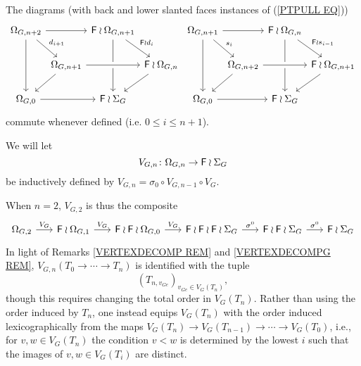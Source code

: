\documentclass[a4paper,10pt]{article}%
\begin{document}
\begin{remark}\label{DSCOM REM}
The diagrams (with back and lower slanted faces instances of (\ref{PTPULL EQ}))
	\[
	\begin{tikzcd}[column sep = 0.1em]
		\Omega_{G,{n+2}} \ar{rr} \ar{rd}{d_{i+1}} \ar{dd}
		 & & \Fin \wr \Omega_{G,{n+1}} \ar{rd}{\Fin \wr d_i} \ar{dd} & &
		\Omega_{G,{n+1}} \ar{rr} \ar{rd}{s_{i}} \ar{dd} 
		& & \Fin \wr \Omega_{G,{n}} \ar{rd}{\Fin \wr s_{i-1}} \ar{dd} &
	\\
		& \Omega_{G,{n+1}} \ar{ld} \ar[crossing over]{rr} 
		& & \Fin \wr \Omega_{G,{n}} \ar{ld} &
		& \Omega_{G,{n+2}} \ar{ld} \ar[crossing over]{rr} 
		& & \Fin \wr \Omega_{G,{n+1}} \ar{ld}
	\\
		 \Omega_{G,0} \ar{rr} & & \Fin \wr \Sigma_G & &
		 \Omega_{G,0} \ar{rr} & & \Fin \wr \Sigma_G &
	\end{tikzcd}
	\]
commute whenever defined (i.e. $0 \leq i \leq n+1$).
\end{remark}


\begin{notation}\label{INDVNG NOT}
	We will let 
\[
	V_{G,n} \colon \Omega_{G,n} \to \mathsf{F} \wr \Sigma_G
\]
be inductively defined by 
$V_{G,n} = \sigma_0 \circ V_{G,n-1} \circ V_G$.
\end{notation}

\begin{remark}
When $n = 2$, $V_{G,2}$ is thus the composite
\[
\begin{tikzcd}[column sep =1.7em]
	\Omega_{G,2} \ar{r}{V_G} &
	\Fin \wr \Omega_{G,1} \ar{r}{V_G} &
	\Fin \wr \Fin \wr \Omega_{G,0} \ar{r}{V_G} &
	\Fin \wr \Fin \wr \Fin \wr \Sigma_{G} \ar{r}{\sigma^0} &
	\Fin \wr \Fin \wr \Sigma_{G} \ar{r}{\sigma^0} &
	\Fin \wr \Sigma_{G}
\end{tikzcd}
\]
In light of Remarks \ref{VERTEXDECOMP REM} and \ref{VERTEXDECOMPG REM}, 
$V_{G,n}(T_0 \to \cdots \to T_n)$ is identified with the tuple 
\begin{equation}\label{VGNISO EQ}
	(T_{n,v_{G e}})_{v_{G e} \in V_G(T_n)},
\end{equation}
though this requires changing the total order in $V_G(T_n)$. Rather than using the order induced by $T_n$, one instead equips 
$V_G(T_n)$ with the order induced lexicographically
from the maps 
$V_G(T_n) \to V_G(T_{n-1}) \to \cdots \to V_G(T_0)$, i.e., for 
$v,w \in V_G(T_n)$ the condition $v<w$ is determined by the lowest $i$ such that the images of $v,w \in V_G(T_i)$ are distinct.
\end{remark}
\end{document}
